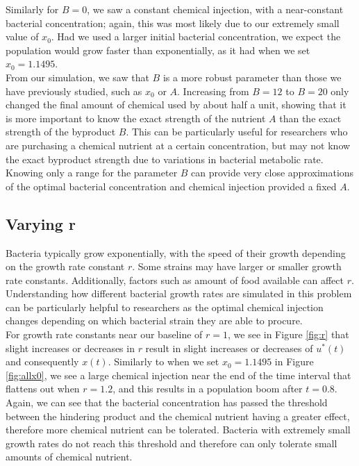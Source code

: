 \documentclass[10pt]{article}
\theoremstyle{exmp}
\begin{document}
\noindent Similarly for $B = 0$, we saw a constant chemical injection, with a near-constant bacterial concentration; again, this was most likely due to our extremely small value of $x_0$. Had we used a larger initial bacterial concentration, we expect the population would grow faster than exponentially, as it had when we set $x_0 = 1.1495$.\\

\noindent From our simulation, we saw that $B$ is a more robust parameter than those we have previously studied, such as $x_0$ or $A$. Increasing from $B = 12$ to $B = 20$ only changed the final amount of chemical used by about half a unit, showing that it is more important to know the exact strength of the nutrient $A$ than the exact strength of the byproduct $B$. This can be particularly useful for researchers who are purchasing a chemical nutrient at a certain concentration, but may not know the exact byproduct strength due to variations in bacterial metabolic rate. Knowing only a range for the parameter $B$ can provide very close approximations of the optimal bacterial concentration and chemical injection provided a fixed $A$. \\

\subsection{Varying r}

\noindent Bacteria typically grow exponentially, with the speed of their growth depending on the growth rate constant $r$. Some strains may have larger or smaller growth rate constants. Additionally, factors such as amount of food available can affect $r$. Understanding how different bacterial growth rates are simulated in this problem can be particularly helpful to researchers as the optimal chemical injection changes depending on which bacterial strain they are able to procure. \\

\noindent For growth rate constants near our baseline of $r = 1$, we see in Figure \ref{fig:r} that slight increases or decreases in $r$ result in slight increases or decreases of $u^*(t)$ and consequently $x(t)$.  Similarly to when we set $x_0 = 1.1495$ in Figure \ref{fig:allx0}, we see a large chemical injection near the end of the time interval that flattens out when $r = 1.2$, and this results in a population boom after $t = 0.8$. Again, we can see that the bacterial concentration has passed the threshold between the hindering product and the chemical nutrient having a greater effect, therefore more chemical nutrient can be tolerated. Bacteria with extremely small growth rates do not reach this threshold and therefore can only tolerate small amounts of chemical nutrient. \\
\end{document}

